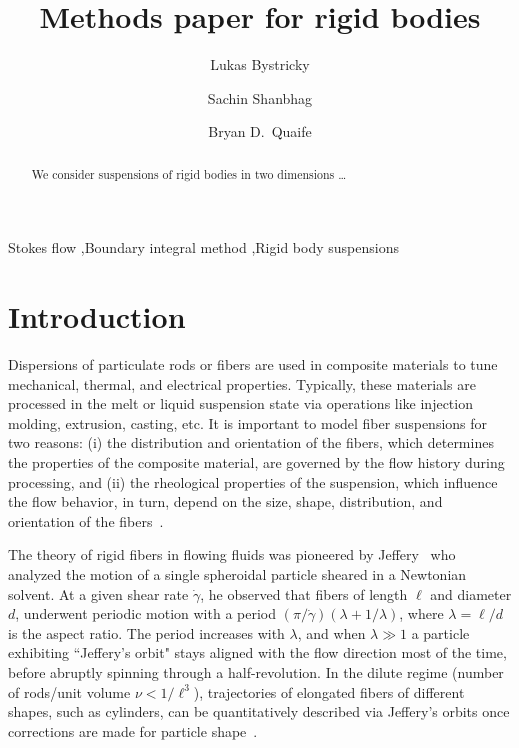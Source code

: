 \documentclass[preprint, 10pt]{elsarticle}
\begin{document}
\title{Methods paper for rigid bodies}

\author[Lukas]{Lukas Bystricky}
\author[Lukas]{Sachin Shanbhag}
\author[Bryan]{Bryan D.~Quaife}
\address[Lukas]{Department of Scientific Computing, Florida State University,
Tallahassee, FL, 32306.}
\address[Bryan]{Department of Scientific Computing and Geophysical Fluid
Dynamics Institute, Florida State University, Tallahassee, FL, 32306.}

\begin{abstract} 
We consider suspensions of rigid bodies in two dimensions \ldots
\end{abstract}

\begin{keyword}
  Stokes flow \sep Boundary integral method \sep Rigid body suspensions 
\end{keyword}

\maketitle


\section{Introduction\label{s:intro}}
Dispersions of particulate rods or fibers are used in composite
materials to tune mechanical, thermal, and electrical properties.
Typically, these materials are processed in the melt or liquid
suspension state via operations like injection molding, extrusion,
casting, etc. It is important to model fiber suspensions for two
reasons: (i) the distribution and orientation of the fibers, which
determines the properties of the composite material, are governed by the
flow history during processing, and (ii) the rheological properties of
the suspension, which influence the flow behavior, in turn, depend on
the size, shape, distribution, and orientation of the
fibers~\cite{larsoncf}.

The theory of rigid fibers in flowing fluids was pioneered by
Jeffery~\cite{Jeffery1922} who analyzed the motion of a single
spheroidal particle sheared in a Newtonian solvent. At a given shear
rate $\dot{\gamma}$, he observed that fibers of length $\ell$ and diameter
$d$, underwent periodic motion with a period $(\pi/\dot{\gamma})
(\lambda + 1/\lambda)$, where $\lambda = \ell/d$ is the aspect ratio. The
period increases with $\lambda$, and when $\lambda \gg 1$ a particle
exhibiting ``Jeffery's orbit" stays aligned with the flow direction most
of the time, before abruptly spinning through a half-revolution. In the
dilute regime (number of rods/unit volume $\nu < 1/\ell^3$), trajectories
of elongated fibers of different shapes, such as cylinders, can be
quantitatively described via Jeffery's orbits once corrections are made
for particle shape~\cite{Bretherton1962}.
\end{document}
